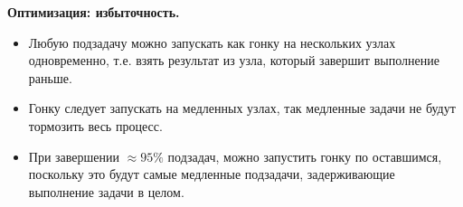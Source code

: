 \textbf{Оптимизация: избыточность.}
\begin{itemize}
  \item Любую подзадачу можно запускать как гонку на нескольких узлах
    одновременно, т.е. взять результат из узла, который завершит выполнение
    раньше.
  \item Гонку следует запускать на медленных узлах, так медленные задачи не
    будут тормозить весь процесс.
  \item При завершении $\approx 95\%$ подзадач, можно запустить гонку по
    оставшимся, поскольку это будут самые медленные подзадачи, задерживающие
    выполнение задачи в целом.
\end{itemize}
